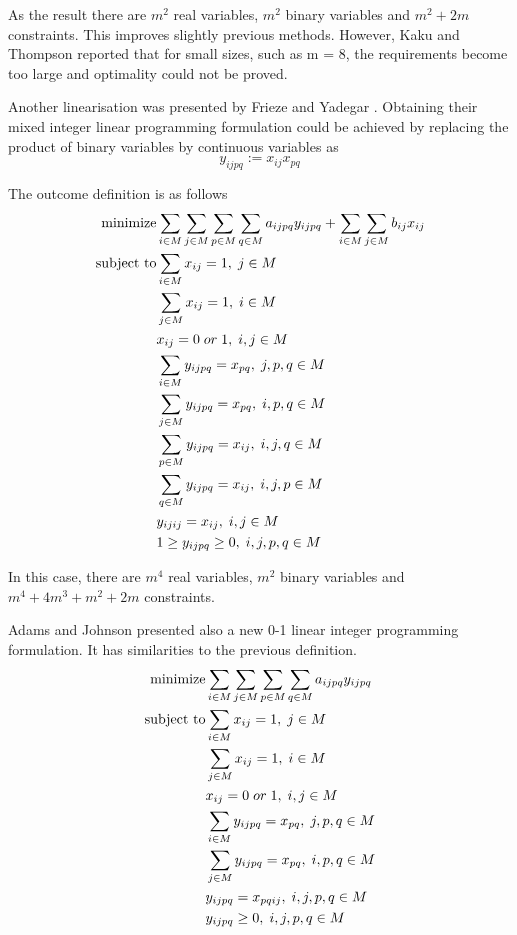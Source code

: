 As the result there are $m^2$ real variables, $m^2$ binary variables and $m^2 + 2m$ constraints.
This improves slightly previous methods.
However, Kaku and Thompson \cite{kaku1986exact} reported that for small sizes, such as m = 8, the requirements become too large and optimality could not be proved.

Another linearisation was presented by Frieze and Yadegar \cite{frieze1983quadratic}.
Obtaining their mixed integer linear programming formulation could be achieved by replacing the product of binary variables by continuous variables as
\begin{equation}
  y_{ijpq} := x_{ij} x_{pq}
\end{equation}

The outcome definition is as follows
\begin{align}
  \text{minimize} &\null \sum_{i \in M} \sum_{j \in M} \sum_{p \in M} \sum_{q \in M} a_{ijpq}y_{ijpq} + \sum_{i \in M} \sum_{j \in M} b_{ij} x_{ij} \\
  \text{subject to} &\null \sum_{i \in M} x_{ij} = 1, \; j \in M \\
  &\null \sum_{j \in M} x_{ij} = 1, \; i \in M \\
  &\null x_{ij} = 0 \; or \; 1, \; i, j \in M \\
  &\null \sum_{i \in M} y_{ijpq} = x_{pq}, \; j, p, q \in M \\
  &\null \sum_{j \in M} y_{ijpq} = x_{pq}, \; i, p, q \in M \\
  &\null \sum_{p \in M} y_{ijpq} = x_{ij}, \; i, j, q \in M \\
  &\null \sum_{q \in M} y_{ijpq}= x_{ij}, \; i, j, p \in M \\
  &\null y_{ijij} = x_{ij}, \; i, j \in M \\
  &\null 1 \geq y_{ijpq} \geq 0, \; i, j, p, q \in M
\end{align}

In this case, there are $m^4$ real variables, $m^2$ binary variables and $m^4 + 4m^3+m^2+2m$ constraints.

Adams and Johnson \cite{adams1994improved} presented also a new 0-1 linear integer programming formulation.
It has similarities to the previous definition.
\begin{align}
  \text{minimize} &\null \sum_{i \in M} \sum_{j \in M} \sum_{p \in M} \sum_{q \in M} a_{ijpq}y_{ijpq} \\
  \text{subject to} &\null \sum_{i \in M} x_{ij} = 1, \; j \in M \\
  &\null \sum_{j \in M} x_{ij} = 1, \; i \in M \\
  &\null x_{ij} = 0 \; or \; 1, \; i, j \in M \\
  &\null \sum_{i \in M} y_{ijpq} = x_{pq}, \; j, p, q \in M \\
  &\null \sum_{j \in M} y_{ijpq} = x_{pq}, \; i, p, q \in M \\
  &\null y_{ijpq} = x_{pqij}, \; i, j, p, q \in M \\
  &\null y_{ijpq} \geq 0, \; i, j, p, q \in M
\end{align}

